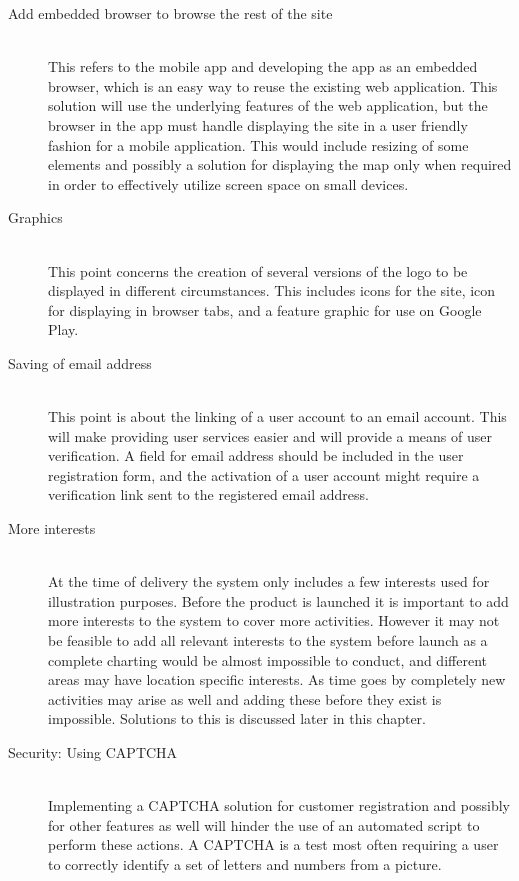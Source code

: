 \begin{description}
  \item[Add embedded browser to browse the rest of the site] \hfill \\ This refers to the mobile app and developing the app as an embedded browser, which is an easy way to reuse the existing web application. This solution will use the underlying features of the web application, but the browser in the app must handle displaying the site in a user friendly fashion for a mobile application. This would include resizing of some elements and possibly a solution for displaying the map only when required in order to effectively utilize screen space on small devices.
  \item[Graphics] \hfill \\ This point concerns the creation of several versions of the logo to be displayed in different circumstances. This includes icons for the site, icon for displaying in browser tabs, and a feature graphic for use on Google Play.
  \item[Saving of email address] \hfill \\ This point is about the linking of a user account to an email account. This will make providing user services easier and will provide a means of user verification. A field for email address should be included in the user registration form, and the activation of a user account might require a verification link sent to the registered email address.
  \item[More interests] \hfill \\ At the time of delivery the system only includes a few interests used for illustration purposes. Before the product is launched it is important to add more interests to the system to cover more activities. However it may not be feasible to add all relevant interests to the system before launch as a complete charting would be almost impossible to conduct, and different areas may have location specific interests. As time goes by completely new activities may arise as well and adding these before they exist is impossible. Solutions to this is discussed later in this chapter.
  \item[Security: Using CAPTCHA] \hfill \\ Implementing a CAPTCHA solution for customer registration and possibly for other features as well will hinder the use of an automated script to perform these actions. A CAPTCHA is a test most often requiring a user to correctly identify a set of letters and numbers from a picture.

\end{description}
